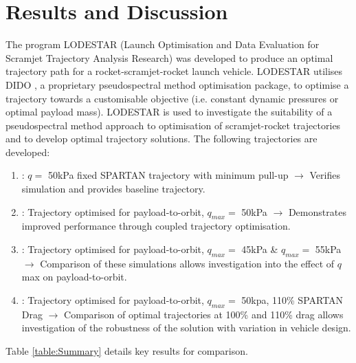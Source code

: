 \documentclass[]{aiaa-tc}
\begin{document}
\section{Results and Discussion} \label{section:results}
The program LODESTAR (Launch Optimisation and Data Evaluation for Scramjet Trajectory Analysis Research) was developed to produce an optimal trajectory path for a rocket-scramjet-rocket launch vehicle. LODESTAR utilises DIDO \cite{Ross,Ross2004}, a proprietary pseudospectral method optimisation package, to optimise a trajectory towards a customisable objective (i.e. constant dynamic pressures or optimal payload mass). 
LODESTAR is used to investigate the suitability of a pseudospectral method approach to optimisation of scramjet-rocket trajectories and to develop optimal trajectory solutions. The following trajectories are developed: 
\begin{enumerate}
	\item: $q = $ 50kPa fixed SPARTAN trajectory with minimum pull-up \newline$\rightarrow$ Verifies simulation and provides baseline trajectory.
	\item: Trajectory optimised for payload-to-orbit, $q_{max} = $ 50kPa \newline$\rightarrow$ Demonstrates improved performance through coupled trajectory optimisation.
	\item: Trajectory optimised for payload-to-orbit, $q_{max} = $ 45kPa \& $q_{max} = $ 55kPa \newline$\rightarrow$ Comparison of these simulations allows investigation into the effect of $q$ max on payload-to-orbit.
	\item: Trajectory optimised for payload-to-orbit,  $q_{max} = $ 50kpa, 110\% SPARTAN Drag \newline$\rightarrow$ Comparison of optimal trajectories at 100\% and 110\% drag allows investigation of the robustness of the solution with variation in vehicle design. 
\end{enumerate}

Table \ref{table:Summary} details key results for comparison. 
\end{document}
